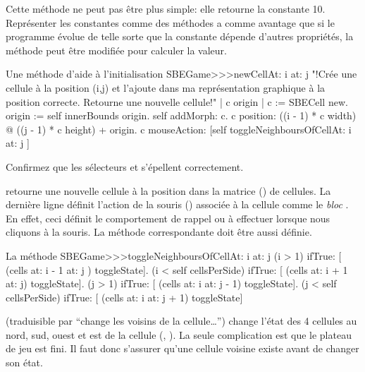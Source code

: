 \documentclass[a4paper,10pt,twoside]{book}
\begin{document}
Cette méthode ne peut pas \^etre plus simple: elle retourne la constante
10. Représenter les constantes comme des méthodes a comme avantage que si le programme évolue de telle sorte que la constante dépende d'autres propriétés, la méthode peut \^etre modifiée pour calculer la valeur.

\begin{method}[newCellAt:at:]{Une méthode d'aide à l'initialisation}
SBEGame>>>newCellAt: i at: j
   "!Crée une cellule à la position (i,j) et l'ajoute dans ma représentation graphique à la position correcte. Retourne une nouvelle cellule!"
   | c origin |
   c := SBECell new.
   origin := self innerBounds origin.
   self addMorph: c.
   c position: ((i - 1) * c width) @ ((j - 1) * c height) + origin.
   c mouseAction: [self toggleNeighboursOfCellAt: i at: j ]
\end{method}

Confirmez que les sélecteurs  et  s'épellent correctement.

 retourne une nouvelle cellule  à la position  dans la matrice () de cellules.
La dernière ligne définit l'action de la souris () associée à la cellule comme le \emph{bloc}
\mbox{.}
En effet, ceci définit le comportement de rappel ou \callback à effectuer lorsque nous cliquons à la souris.
La méthode correspondante doit \^etre aussi définie.

\begin{method}[toggleNeighboursOfCellAt:at:]{La méthode \callback}
SBEGame>>>toggleNeighboursOfCellAt: i at: j
   (i > 1) ifTrue: [ (cells at: i - 1 at: j ) toggleState].
   (i < self cellsPerSide) ifTrue: [ (cells at: i + 1 at: j) toggleState].
   (j > 1) ifTrue: [ (cells at: i  at: j - 1) toggleState].
   (j < self cellsPerSide) ifTrue: [ (cells at: i at: j + 1) toggleState]
\end{method}

 (traduisible par ``change les
voisins de la cellule\ldots'') change l'état des 4 cellules au nord, sud, ouest et est de la cellule (, ). La seule complication est que le plateau de jeu est fini. Il faut donc s'assurer qu'une cellule voisine existe avant de changer son état.
\end{document}
